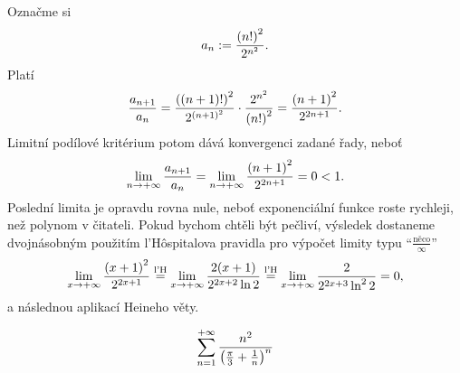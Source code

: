\documentclass[answers]{exam}
\let\originalleft\left
\let\originalright\right
\renewcommand{\left}{\mathopen{}\mathclose\bgroup\originalleft}
\renewcommand{\right}{\aftergroup\egroup\originalright}
\begin{document}
\begin{questions}
  \begin{solution}
  	Označme si
  	\begin{equation*}
  		a_n
  		:=
  		\frac{\left( n! \right)^2}{2^{n^2}}.
  	\end{equation*}
  	Platí
  	\begin{equation*}
  		\frac{a_{n + 1}}{a_n}
  		=
  		\frac{\left( \left( n + 1 \right)! \right)^2}{2^{\left( n + 1 \right)^2}}
  		\cdot
  		\frac{2^{n^2}}{\left( n! \right)^2}
  		=
  		\frac{\left( n + 1 \right)^2}{2^{2n + 1}}.
  	\end{equation*}
  	Limitní podílové kritérium potom dává konvergenci zadané řady, neboť
  	\begin{equation*}
  		\lim_{n \to +\infty}
  		\frac{a_{n + 1}}{a_n}
  		=
  		\lim_{n \to +\infty}
  		\frac{\left( n + 1 \right)^2}{2^{2n + 1}}
  		=
  		0
  		<
  		1.
  	\end{equation*}
  	Poslední limita je opravdu rovna nule, neboť exponenciální funkce roste rychleji, než polynom v čitateli. Pokud bychom chtěli být pečliví, výsledek dostaneme dvojnásobným použitím l'Hôspitalova pravidla pro výpočet limity typu ``$\frac{\textrm{něco}}{\infty}$''
  	\begin{equation*}
  		\lim_{x \to +\infty}
  		\frac{\left( x + 1 \right)^2}{2^{2x + 1}}
  		\stackrel{\text{l'H}}{=}
  		\lim_{x \to +\infty}
  		\frac{2 \left( x + 1 \right)}{2^{2x + 2} \ln 2}
  		\stackrel{\text{l'H}}{=}
  		\lim_{x \to +\infty}
  		\frac{2}{2^{2x + 3} \ln^2 2}
  		=
  		0,
  	\end{equation*}
  	a následnou aplikací Heineho věty.
  \end{solution}
  
  \question
  \begin{equation*}
    \sum_{n = 1}^{+\infty}
		\frac{n^2}{\left( \frac{\pi}{3} + \frac{1}{n} \right)^n}
  \end{equation*}
  

\end{questions}
\end{document}
